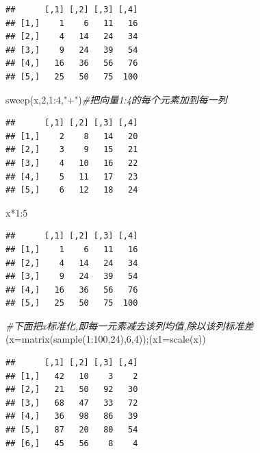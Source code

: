 \documentclass[
]{book}
\newenvironment{Shaded}{\begin{snugshade}}{\end{snugshade}}
\newcommand{\AttributeTok}[1]{\textcolor[rgb]{0.77,0.63,0.00}{#1}}
\newcommand{\CommentTok}[1]{\textcolor[rgb]{0.56,0.35,0.01}{\textit{#1}}}
\newcommand{\DecValTok}[1]{\textcolor[rgb]{0.00,0.00,0.81}{#1}}
\newcommand{\FunctionTok}[1]{\textcolor[rgb]{0.00,0.00,0.00}{#1}}
\newcommand{\NormalTok}[1]{#1}
\newcommand{\SpecialCharTok}[1]{\textcolor[rgb]{0.00,0.00,0.00}{#1}}
\newcommand{\StringTok}[1]{\textcolor[rgb]{0.31,0.60,0.02}{#1}}
\begin{document}
\begin{verbatim}
##      [,1] [,2] [,3] [,4]
## [1,]    1    6   11   16
## [2,]    4   14   24   34
## [3,]    9   24   39   54
## [4,]   16   36   56   76
## [5,]   25   50   75  100
\end{verbatim}

\begin{Shaded}
\begin{Highlighting}[]
\FunctionTok{sweep}\NormalTok{(x,}\DecValTok{2}\NormalTok{,}\DecValTok{1}\SpecialCharTok{:}\DecValTok{4}\NormalTok{,}\StringTok{"+"}\NormalTok{)}\CommentTok{\#把向量1:4的每个元素加到每一列}
\end{Highlighting}
\end{Shaded}

\begin{verbatim}
##      [,1] [,2] [,3] [,4]
## [1,]    2    8   14   20
## [2,]    3    9   15   21
## [3,]    4   10   16   22
## [4,]    5   11   17   23
## [5,]    6   12   18   24
\end{verbatim}

\begin{Shaded}
\begin{Highlighting}[]
\NormalTok{x}\SpecialCharTok{*}\DecValTok{1}\SpecialCharTok{:}\DecValTok{5}
\end{Highlighting}
\end{Shaded}

\begin{verbatim}
##      [,1] [,2] [,3] [,4]
## [1,]    1    6   11   16
## [2,]    4   14   24   34
## [3,]    9   24   39   54
## [4,]   16   36   56   76
## [5,]   25   50   75  100
\end{verbatim}

\begin{Shaded}
\begin{Highlighting}[]
\CommentTok{\#下面把x标准化,即每一元素减去该列均值,除以该列标准差}
\NormalTok{(}\AttributeTok{x=}\FunctionTok{matrix}\NormalTok{(}\FunctionTok{sample}\NormalTok{(}\DecValTok{1}\SpecialCharTok{:}\DecValTok{100}\NormalTok{,}\DecValTok{24}\NormalTok{),}\DecValTok{6}\NormalTok{,}\DecValTok{4}\NormalTok{));(}\AttributeTok{x1=}\FunctionTok{scale}\NormalTok{(x))}
\end{Highlighting}
\end{Shaded}

\begin{verbatim}
##      [,1] [,2] [,3] [,4]
## [1,]   42   10    3    2
## [2,]   21   50   92   30
## [3,]   68   47   33   72
## [4,]   36   98   86   39
## [5,]   87   20   80   54
## [6,]   45   56    8    4
\end{verbatim}
\end{document}
